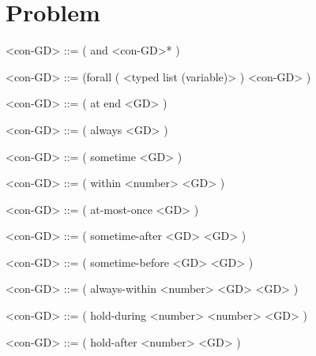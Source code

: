 \documentclass[]{article}
\begin{document}
\section{Problem}

\begin{grammar}
    <con-GD> ::= ( and <con-GD>* )

    <con-GD> ::= (forall ( <typed list (variable)> ) <con-GD> )

    <con-GD> ::= ( at end <GD> )

    <con-GD> ::= ( always <GD> )

    <con-GD> ::= ( sometime <GD> )

    <con-GD> ::= ( within <number> <GD> )

    <con-GD> ::= ( at-most-once <GD> )

    <con-GD> ::= ( sometime-after <GD> <GD> )

    <con-GD> ::= ( sometime-before <GD> <GD> )

    <con-GD> ::= ( always-within <number> <GD> <GD> )

    <con-GD> ::= ( hold-during <number> <number> <GD> )

    <con-GD> ::= ( hold-after <number> <GD> )
\end{grammar}

\nocite{mcdermott-et-al-1998}



\end{document}
